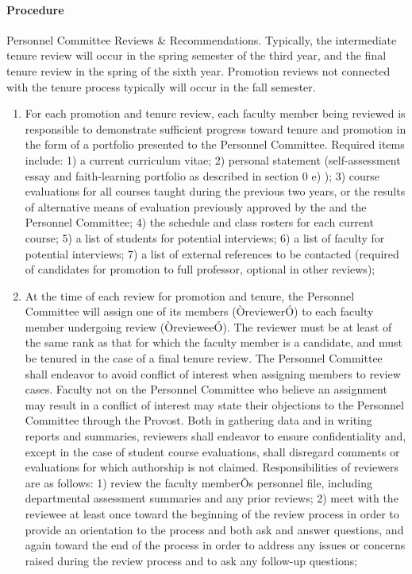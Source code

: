 \documentclass[letterpaper, 11pt]{article}
\begin{document}
			\paragraph{Procedure}
				Personnel Committee Reviews \& Recommendations.  Typically, the intermediate tenure review will occur in the spring semester of the third year, and the final tenure review in the spring of the sixth year.  Promotion reviews not connected with the tenure process typically will occur in the fall semester.
				\begin{enumerate}[label=\alph*)]
					\item{For each promotion and tenure review, each faculty member being reviewed is responsible to demonstrate sufficient progress toward tenure and promotion in the form of a portfolio presented to the Personnel Committee. Required items include:}
					1) a current curriculum vitae;
					2) personal statement (self-assessment essay and faith-learning portfolio as described in section 0 e) );
					3) course evaluations for all courses taught during the previous two years, or the results of alternative means of evaluation previously approved by the and the Personnel Committee;
					4) the schedule and class rosters for each current course;
					5) a list of students for potential interviews;
					6) a list of faculty for potential interviews;
					7) a list of external references to be contacted (required of candidates for promotion to full professor, optional in other reviews);
					\item{At the time of each review for promotion and tenure, the Personnel Committee will assign one of its members (ÒreviewerÓ) to each faculty member undergoing review (ÒrevieweeÓ).  The reviewer must be at least of the same rank as that for which the faculty member is a candidate, and must be tenured in the case of a final tenure review.  The Personnel Committee shall endeavor to avoid conflict of interest when assigning members to review cases.  Faculty not on the Personnel Committee who believe an assignment may result in a conflict of interest may state their objections to the Personnel Committee through the Provost.  Both in gathering data and in writing reports and summaries, reviewers shall endeavor to ensure confidentiality and, except in the case of student course evaluations, shall disregard comments or evaluations for which authorship is not claimed.  Responsibilities of reviewers are as follows:}
					1) review the faculty memberÕs personnel file, including departmental assessment summaries and any prior reviews;
					2) meet with the reviewee at least once toward the beginning of the review process in order to provide an orientation to the process and both ask and answer questions, and again toward the end of the process in order to address any issues or concerns raised during the review process and to ask any follow-up questions;

\end{enumerate}
\end{document}
